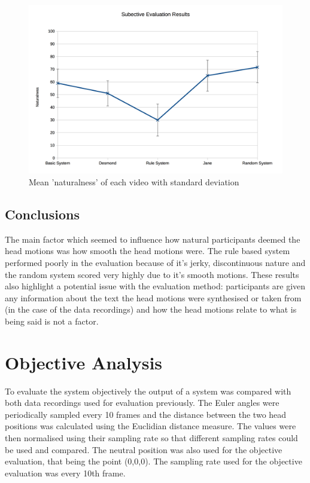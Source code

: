 \documentclass[bsc,frontabs,twoside,singlespacing,parskip,deptreport]{infthesis}
\begin{document}
\begin{figure}
	\centering
	\includegraphics[width=1.0\textwidth]{chart.png}
	\caption{Mean 'naturalness' of each video with standard deviation}
\end{figure}

\subsection{Conclusions}

The main factor which seemed to influence how natural participants deemed the head motions was how smooth the head motions were. The rule based system performed poorly in the evaluation because of it's jerky, discontinuous nature and the random system scored very highly due to it's smooth motions. These results also highlight a potential issue with the evaluation method: participants are given any information about the text the head motions were synthesised or taken from (in the case of the data recordings) and how the head motions relate to what is being said is not a factor. 


\section{Objective Analysis}

To evaluate the system objectively the output of a system was compared with both data recordings used for evaluation previously. The Euler angles were periodically sampled every 10 frames and the distance between the two head positions was calculated using the Euclidian distance measure. The values were then normalised using their sampling rate so that different sampling rates could be used and compared. The neutral position was also used for the objective evaluation, that being the point (0,0,0). The sampling rate used for the objective evaluation was every 10th frame. 
\end{document}

